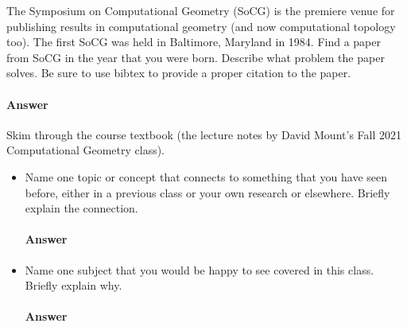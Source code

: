 \documentclass{article}
\begin{document}
\collab{\todo{}}

The Symposium on Computational Geometry (SoCG) is the premiere venue for publishing
results in computational geometry (and now computational topology too).  The
first SoCG was held in Baltimore, Maryland in 1984.  Find a paper from SoCG in
the year that you were born.
Describe what problem the paper solves.  Be sure to use bibtex to provide a
proper citation to the paper.

\paragraph{Answer}


\collab{\todo{}}

Skim through the course textbook (the lecture notes by David Mount's Fall 2021
Computational Geometry class).

\begin{itemize}
    \item Name one topic or concept that connects to something that you have
        seen before, either in a previous class or your own research or
        elsewhere. Briefly explain the connection.

        \paragraph{Answer}

    \item Name one subject that you would be happy to see covered
        in this class.  Briefly explain why.

        \paragraph{Answer}

\end{itemize}



\collab{\todo{}}
\end{document}
